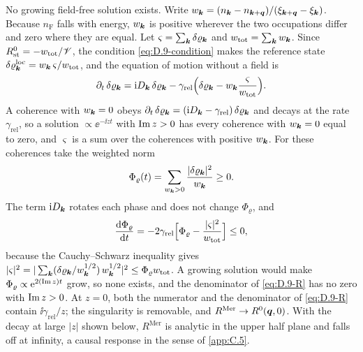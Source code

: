 No growing field-free solution exists. Write $w_{\bm{k}} = (n_{\bm{k}} - n_{\bm{k}+\bm{q}})/(\xi_{\bm{k}+\bm{q}} - \xi_{\bm{k}})$. Because $n_{\mathrm{F}}$ falls with energy, $w_{\bm{k}}$ is positive wherever the two occupations differ and zero where they are equal. Let $\varsigma = \sum_{\bm{k}}\delta\varrho_{\bm{k}}$ and $w_{\mathrm{tot}} = \sum_{\bm{k}}w_{\bm{k}}$. Since $R^0_{\mathrm{st}} = -w_{\mathrm{tot}}/\mathscr{V}$, the condition \cref{eq:D.9-condition} makes the reference state $\delta\varrho^{\mathrm{loc}}_{\bm{k}} = w_{\bm{k}}\,\varsigma/w_{\mathrm{tot}}$, and the equation of motion without a field is
\begin{equation*}
  \partial_t\,\delta\varrho_{\bm{k}} = \mathrm{i} D_{\bm{k}}\,\delta\varrho_{\bm{k}} - \gamma_{\mathrm{rel}}\Bigl(\delta\varrho_{\bm{k}} - w_{\bm{k}}\frac{\varsigma}{w_{\mathrm{tot}}}\Bigr) .
\end{equation*}
A coherence with $w_{\bm{k}} = 0$ obeys $\partial_t\,\delta\varrho_{\bm{k}} = (\mathrm{i} D_{\bm{k}} - \gamma_{\mathrm{rel}})\,\delta\varrho_{\bm{k}}$ and decays at the rate $\gamma_{\mathrm{rel}}$, so a solution $\propto \ee^{-\ii zt}$ with $\operatorname{Im} z > 0$ has every coherence with $w_{\bm{k}} = 0$ equal to zero, and $\varsigma$ is a sum over the coherences with positive $w_{\bm{k}}$. For these coherences take the weighted norm
\begin{equation*}
  \Phi_\varrho(t) = \sum_{w_{\bm{k}} > 0}\frac{|\delta\varrho_{\bm{k}}|^2}{w_{\bm{k}}} \ge 0 .
\end{equation*}
The term $\mathrm{i} D_{\bm{k}}$ rotates each phase and does not change $\Phi_\varrho$, and
\begin{equation*}
  \frac{\mathrm{d}\Phi_\varrho}{\mathrm{d} t} = -2\gamma_{\mathrm{rel}}\Bigl[\Phi_\varrho - \frac{|\varsigma|^2}{w_{\mathrm{tot}}}\Bigr] \le 0 ,
\end{equation*}
because the Cauchy--Schwarz inequality gives $|\varsigma|^2 = |\sum_{\bm{k}}(\delta\varrho_{\bm{k}}/w_{\bm{k}}^{1/2})\,w_{\bm{k}}^{1/2}|^2 \le \Phi_\varrho w_{\mathrm{tot}}$. A growing solution would make $\Phi_\varrho \propto \mathrm{e}^{2(\operatorname{Im} z)t}$ grow, so none exists, and the denominator of \cref{eq:D.9-R} has no zero with $\operatorname{Im} z > 0$. At $z = 0$, both the numerator and the denominator of \cref{eq:D.9-R} contain $\ii\gamma_{\mathrm{rel}}/z$; the singularity is removable, and $R^{\mathrm{Mer}} \to R^0(\bm{q},0)$. With the decay at large $|z|$ shown below, $R^{\mathrm{Mer}}$ is analytic in the upper half plane and falls off at infinity, a causal response in the sense of \cref{app:C.5}.

